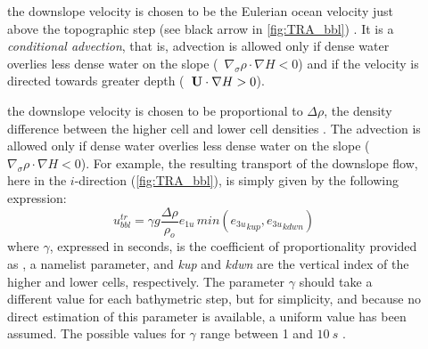 \documentclass[../main/NEMO_manual]{subfiles}
\begin{document}
\begin{description}
\item [{}] the downslope velocity is chosen to
  be the Eulerian ocean velocity just above the topographic step
  (see black arrow in \autoref{fig:TRA_bbl}) \citep{beckmann.doscher_JPO97}.
  It is a \textit{conditional advection}, that is,
  advection is allowed only if dense water overlies less dense water on the slope
  (\ie\ $\nabla_\sigma \rho \cdot \nabla H < 0$) and if the velocity is directed towards greater depth
  (\ie\ $\mathbf{U} \cdot \nabla H > 0$).
\item [{}] the downslope velocity is chosen to be proportional to
  $\Delta \rho$, the density difference between the higher cell and lower cell densities
  \citep{campin.goosse_T99}.
  The advection is allowed only  if dense water overlies less dense water on the slope
  (\ie\ $\nabla_\sigma \rho \cdot \nabla H < 0$).
  For example, the resulting transport of the downslope flow, here in the $i$-direction
  (\autoref{fig:TRA_bbl}), is simply given by the following expression:
  \[
    u^{tr}_{bbl} = \gamma g \frac{\Delta \rho}{\rho_o} e_{1u} \, min ({e_{3u}}_{kup},{e_{3u}}_{kdwn})
  \]
  where $\gamma$, expressed in seconds, is the coefficient of proportionality provided as
  , a namelist parameter, and
  \textit{kup} and \textit{kdwn} are the vertical index of the higher and lower cells, respectively.
  The parameter $\gamma$ should take a different value for each bathymetric step, but for simplicity,
  and because no direct estimation of this parameter is available, a uniform value has been assumed.
  The possible values for $\gamma$ range between 1 and $10~s$ \citep{campin.goosse_T99}.
\end{description}
\end{document}

